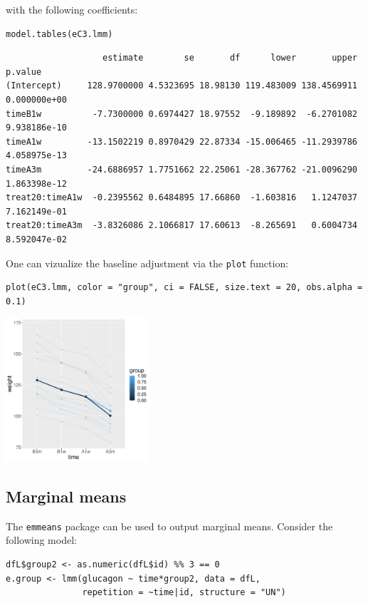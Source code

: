 \documentclass[12pt]{article}
\begin{document}
with the following coefficients:
\lstset{language=r,label= ,caption= ,captionpos=b,numbers=none}
\begin{lstlisting}
model.tables(eC3.lmm)
\end{lstlisting}

\begin{verbatim}
                   estimate        se       df      lower       upper      p.value
(Intercept)     128.9700000 4.5323695 18.98130 119.483009 138.4569911 0.000000e+00
timeB1w          -7.7300000 0.6974427 18.97552  -9.189892  -6.2701082 9.938186e-10
timeA1w         -13.1502219 0.8970429 22.87334 -15.006465 -11.2939786 4.058975e-13
timeA3m         -24.6886957 1.7751662 22.25061 -28.367762 -21.0096290 1.863398e-12
treat20:timeA1w  -0.2395562 0.6484895 17.66860  -1.603816   1.1247037 7.162149e-01
treat20:timeA3m  -3.8326086 2.1066817 17.60613  -8.265691   0.6004734 8.592047e-02
\end{verbatim}


One can vizualize the baseline adjustment via the \texttt{plot} function:
\lstset{language=r,label= ,caption= ,captionpos=b,numbers=none}
\begin{lstlisting}
plot(eC3.lmm, color = "group", ci = FALSE, size.text = 20, obs.alpha = 0.1)
\end{lstlisting}

\begin{center}
\includegraphics[width=0.4\textwidth]{./figures/gg-baseAdj.pdf}
\end{center}

\subsection{Marginal means}
\label{sec:org0860361}

The \texttt{emmeans} package can be used to output marginal means. Consider
the following model:
\lstset{language=r,label= ,caption= ,captionpos=b,numbers=none}
\begin{lstlisting}
dfL$group2 <- as.numeric(dfL$id) %% 3 == 0
e.group <- lmm(glucagon ~ time*group2, data = dfL,
               repetition = ~time|id, structure = "UN")
\end{lstlisting}
\end{document}
